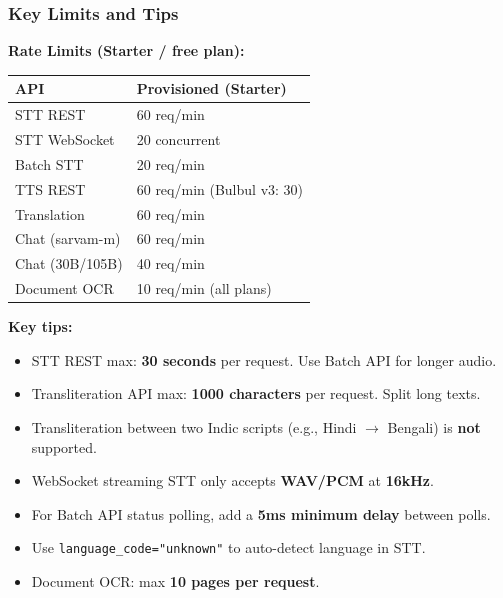 \begin{frame}[fragile]\frametitle{Key Limits and Tips}
\textbf{Rate Limits (Starter / free plan):}
\begin{center}
\begin{tabular}{|l|l|}
\hline
\textbf{API} & \textbf{Provisioned (Starter)} \\
\hline
STT REST & 60 req/min \\
STT WebSocket & 20 concurrent \\
Batch STT & 20 req/min \\
TTS REST & 60 req/min (Bulbul v3: 30) \\
Translation & 60 req/min \\
Chat (sarvam-m) & 60 req/min \\
Chat (30B/105B) & 40 req/min \\
Document OCR & 10 req/min (all plans) \\
\hline
\end{tabular}
\end{center}

\textbf{Key tips:}
  \begin{itemize}
    \item STT REST max: \textbf{30 seconds} per request. Use Batch API for longer audio.
    \item Transliteration API max: \textbf{1000 characters} per request. Split long texts.
    \item Transliteration between two Indic scripts (e.g., Hindi $\to$ Bengali) is \textbf{not} supported.
    \item WebSocket streaming STT only accepts \textbf{WAV/PCM} at \textbf{16kHz}.
    \item For Batch API status polling, add a \textbf{5ms minimum delay} between polls.
    \item Use \texttt{language\_code="unknown"} to auto-detect language in STT.
    \item Document OCR: max \textbf{10 pages per request}.
  \end{itemize}
\end{frame}

